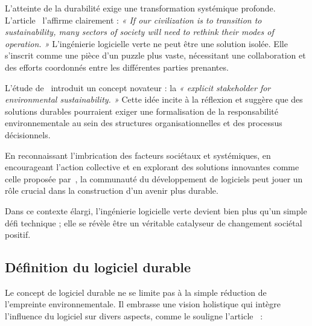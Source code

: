 L'atteinte de la durabilité exige une transformation systémique profonde. L'article~\cite{SafetySecuritySustainability} l'affirme clairement : \emph{« If our civilization is to transition to sustainability, many sectors of society will need to rethink their modes of operation. »} L'ingénierie logicielle verte ne peut être une solution isolée. Elle s'inscrit comme une pièce d'un puzzle plus vaste, nécessitant une collaboration et des efforts coordonnés entre les différentes parties prenantes.


L'étude de~\cite{SafetySecuritySustainability} introduit un concept novateur : la \emph{« explicit stakeholder for environmental sustainability. »} Cette idée incite à la réflexion et suggère que des solutions durables pourraient exiger une formalisation de la responsabilité environnementale au sein des structures organisationnelles et des processus décisionnels.


En reconnaissant l'imbrication des facteurs sociétaux et systémiques, en encourageant l'action collective et en explorant des solutions innovantes comme celle proposée par~\cite{SafetySecuritySustainability}, la communauté du développement de logiciels peut jouer un rôle crucial dans la construction d'un avenir plus durable.


Dans ce contexte élargi, l'ingénierie logicielle verte devient bien plus qu'un simple défi technique ; elle se révèle être un véritable catalyseur de changement sociétal positif.


\subsection{Définition du logiciel durable}

Le concept de logiciel durable ne se limite pas à la simple réduction de l'empreinte environnementale. Il embrasse une vision holistique qui intègre l'influence du logiciel sur divers aspects, comme le souligne l'article~\cite{GreenMeasurementStructure} :

